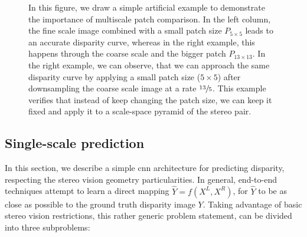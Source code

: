 \documentclass[10pt]{article}
\begin{document}
\begin{figure}[t]
{\begin{subfigure}[t]{0.54\textwidth}
    \vspace{-10pt}
\end{subfigure}
}
\vspace{-15pt}
\caption{In this figure, we draw a simple artificial example to demonstrate the importance of multiscale patch comparison. In the left column, the fine scale image combined with a small patch size $P_{5 \times 5}$ leads to an accurate disparity curve, whereas in the right example, this happens through the coarse scale and the bigger patch $P_{13 \times 13}$. In the right example, we can observe, that we can approach the same disparity curve by applying a small patch size ($5 \times 5$) after downsampling the coarse scale image at a rate $\sfrac{13}{5}$. This example verifies that instead of keep changing the patch size, we can keep it fixed and apply it to a scale-space pyramid of the stereo pair.}
\label{fig:multiscale_importance_2D}  
\vspace{-3pt}      
\end{figure}

\subsection{Single-scale prediction}

In this section, we describe a simple cnn architecture for predicting disparity, respecting the stereo vision geometry particularities. In general, end-to-end techniques attempt to learn a direct mapping $\hat{Y} = f(X^L, X^R)$, for $\hat{Y}$ to be as close as possible to the ground truth disparity image $Y$. Taking advantage of basic stereo vision restrictions, this rather generic problem statement, can be divided into three subproblems:
\end{document}
